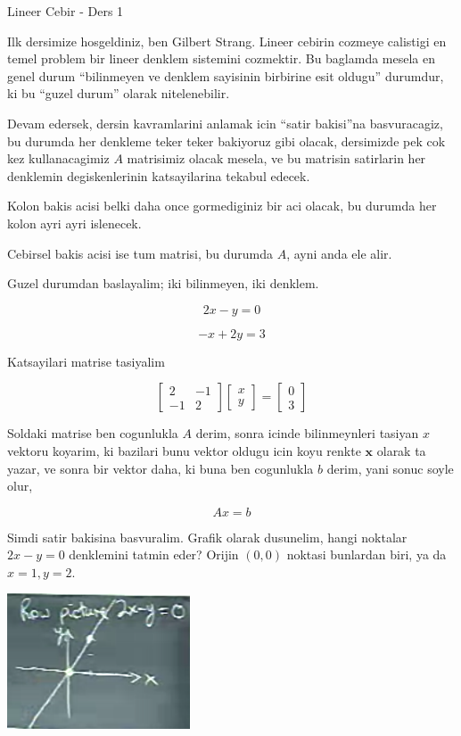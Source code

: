 \documentclass[12pt,fleqn]{article}\usepackage{../common}
\begin{document}
Lineer Cebir - Ders 1

Ilk dersimize hosgeldiniz, ben Gilbert Strang. Lineer cebirin cozmeye
calistigi en temel problem bir lineer denklem sistemini cozmektir. Bu
baglamda mesela en genel durum ``bilinmeyen ve denklem sayisinin birbirine
esit oldugu'' durumdur, ki bu ``guzel durum'' olarak nitelenebilir. 

Devam edersek, dersin kavramlarini anlamak icin ``satir bakisi''na
basvuracagiz, bu durumda her denkleme teker teker bakiyoruz gibi olacak,
dersimizde pek cok kez kullanacagimiz $A$ matrisimiz olacak mesela, ve bu
matrisin satirlarin her denklemin degiskenlerinin katsayilarina tekabul
edecek.

Kolon bakis acisi belki daha once gormediginiz bir aci olacak, bu durumda
her kolon ayri ayri islenecek. 

Cebirsel bakis acisi ise tum matrisi, bu durumda $A$, ayni anda ele alir. 

Guzel durumdan baslayalim; iki bilinmeyen, iki denklem.

$$ 2x - y = 0 $$

$$ -x + 2y = 3 $$

Katsayilari matrise tasiyalim

$$ 
\left[\begin{array}{cc}
2 & -1 \\
-1 & 2
\end{array}\right]
\left[\begin{array}{c}
x \\
y
\end{array}\right]
=
\left[\begin{array}{c}
0 \\
3
\end{array}\right]
 $$

Soldaki matrise ben cogunlukla $A$ derim, sonra icinde bilinmeynleri
tasiyan $x$ vektoru koyarim, ki bazilari bunu vektor oldugu icin koyu
renkte $\mathbf{x}$ olarak ta yazar, ve sonra bir vektor daha, ki buna ben
cogunlukla $b$ derim, yani sonuc soyle olur,

$$ A x = b $$

Simdi satir bakisina basvuralim. Grafik olarak dusunelim, hangi noktalar
$2x - y = 0$ denklemini tatmin eder? Orijin $(0,0)$ noktasi bunlardan biri,
ya da $x=1,y=2$. 

\includegraphics[height=4cm]{1_01.png}
\end{document}
